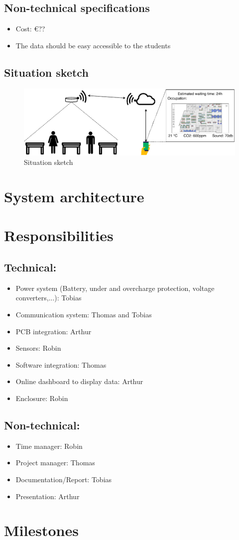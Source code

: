 \documentclass[]{article}
\begin{document}
	\subsection{Non-technical specifications}
	\begin{itemize}
		\item Cost: \euro{??}
		\item The data should be easy accessible to the students
		
	\end{itemize}
	\subsection{Situation sketch}
	\begin{figure}[!ht]
		\centering
		\includegraphics[width=1\linewidth]{situation.pdf}
		\caption{Situation sketch}
		\label{fig:situation}
	\end{figure} 
	
	\section{System architecture}

	\section{Responsibilities}
	\subsection{Technical:}
	\begin{itemize}
		\item Power system (Battery, under and overcharge protection, voltage converters,...): Tobias
		\item Communication system: Thomas and Tobias
		\item PCB integration: Arthur
		\item Sensors: Robin
		\item Software integration: Thomas
		\item Online dashboard to display data: Arthur
		\item Enclosure: Robin
	\end{itemize}

	\subsection{Non-technical: }
	\begin{itemize}
		\item Time manager: Robin
		\item Project manager: Thomas
		\item Documentation/Report: Tobias
		\item Presentation: Arthur
	\end{itemize}

	\section{Milestones}
\end{document}
